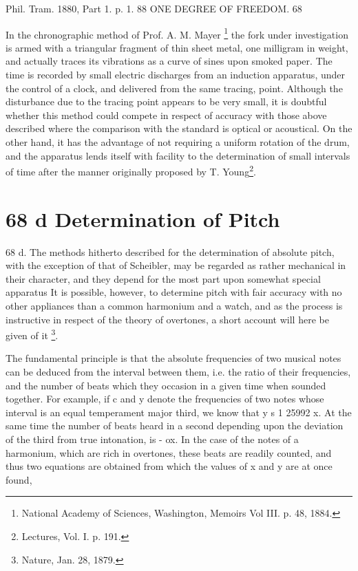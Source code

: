 Phil. Tram. 1880, Part 1. p. 1. 88 ONE DEGREE OF FREEDOM. 68

In the chronographic method of Prof. A. M. Mayer
\footnote{National Academy of Sciences, Washington, Memoirs Vol III. p. 48, 1884.}
the fork under
investigation is armed with a triangular fragment of thin sheet metal,
one milligram in weight, and actually traces its vibrations as a curve
of sines upon smoked paper. The time is recorded by small electric
discharges from an induction apparatus, under the control of a clock,
and delivered from the same tracing, point. Although the disturbance due
to the tracing point appears to be very small, it is doubtful whether
this method could compete in respect of accuracy with those above
described where the comparison with the standard is optical or
acoustical. On the other hand, it has the advantage of not requiring a
uniform rotation of the drum, and the apparatus lends itself with
facility to the determination of small intervals of time after the
manner originally proposed by T. Young\footnote{Lectures, Vol. I. p. 191.}.

\section{68 d Determination of Pitch}\label{pitch}
68 d. The methods hitherto described for the determination of absolute
pitch, with the exception of that of Scheibler, may be regarded as
rather mechanical in their character, and they depend for the most part
upon somewhat special apparatus It is possible, however, to determine
pitch with fair accuracy with no other appliances than a common
harmonium and a watch, and as the process is instructive in respect of
the theory of overtones, a short account will here be given of it
\footnote{Nature, Jan. 28, 1879.}.

The fundamental principle is that the absolute frequencies of two
musical notes can be deduced from the interval between them, i.e. the
ratio of their frequencies, and the number of beats which they occasion
in a given time when sounded together. For example, if c and y denote
the frequencies of two notes whose interval is an equal temperament
major third, we know that y s 1 25992 x. At the same time the number of
beats heard in a second depending upon the deviation of the third from
true intonation, is - ox. In the case of the notes of a harmonium, which
are rich in overtones, these beats are readily counted, and thus two
equations are obtained from which the values of x and y are at once
found,




